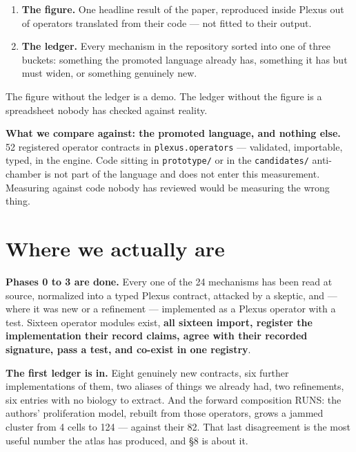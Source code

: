 \documentclass[11pt,a4paper]{article}
\newcommand{\code}[1]{\texttt{#1}}
\begin{document}
\begin{enumerate}
\item \textbf{The figure.} One headline result of the paper, reproduced inside Plexus out of
operators translated from their code --- not fitted to their output.
\item \textbf{The ledger.} Every mechanism in the repository sorted into one of three buckets:
something the promoted language already has, something it has but must widen, or something
genuinely new.
\end{enumerate}

The figure without the ledger is a demo. The ledger without the figure is a spreadsheet nobody
has checked against reality.

\begin{tcolorbox}[colback=grey!6,colframe=grey!45,boxrule=0.7pt,arc=2pt]
\textbf{What we compare against: the promoted language, and nothing else.} 52 registered operator
contracts in \code{plexus.operators} --- validated, importable, typed, in the engine. Code sitting
in \code{prototype/} or in the \code{candidates/} anti-chamber is not part of the language and
does not enter this measurement. Measuring against code nobody has reviewed would be measuring
the wrong thing.
\end{tcolorbox}

\section{Where we actually are}

\textbf{Phases 0 to 3 are done.} Every one of the 24 mechanisms has been read at source,
normalized into a typed Plexus contract, attacked by a skeptic, and --- where it was new or a
refinement --- implemented as a Plexus operator with a test. Sixteen operator modules exist,
\textbf{all sixteen import, register the implementation their record claims, agree with their
recorded signature, pass a test, and co-exist in one registry}.

\textbf{The first ledger is in.} Eight genuinely new contracts, six further implementations of
them, two aliases of things we already had, two refinements, six entries with no biology to
extract. And the forward composition RUNS: the authors' proliferation model, rebuilt from those
operators, grows a jammed cluster from 4 cells to 124 --- against their 82. That last disagreement
is the most useful number the atlas has produced, and \S8 is about it.
\end{document}
